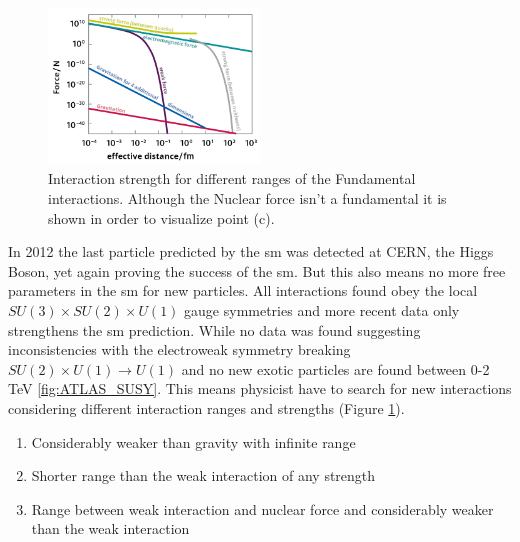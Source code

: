\documentclass[../Bachelorarbeit.tex]{subfiles}
\begin{document}
\label{sec:BSM}
\begin{figure}
    \centering
    \includegraphics[width=0.5\textwidth]{images/Teilchenwet_WW_range.png}
    \caption{Interaction strength for different ranges of the Fundamental interactions. Although the Nuclear force isn't a fundamental it is shown in order to visualize point (c).  \cite{Teilchenwelt} }
    \label{fig:WW_range}
\end{figure}

In 2012 the last particle predicted by the \acrshort{sm} was detected at CERN, the Higgs Boson, yet again proving the success of the \acrshort{sm}.
But this also means no more free parameters in the \acrshort{sm} for new particles. All interactions found obey the local $SU(3) \times SU(2) \times U(1)$ gauge symmetries
and more recent data only strengthens the \acrshort{sm} prediction. While no data was found suggesting inconsistencies with the electroweak symmetry breaking $SU(2) \times U(1) \rightarrow U(1)$
and no new exotic particles are found between 0-2 TeV \ref{fig:ATLAS_SUSY}.
This means physicist have to search for new interactions considering different interaction ranges and strengths (Figure \ref{fig:WW_range}).
\begin{enumerate}[label=(\alph*)]
    \item Considerably weaker than gravity with infinite range
    \item Shorter range than the weak interaction of any strength
    \item Range between weak interaction and nuclear force and considerably weaker than the weak interaction
\end{enumerate}
\end{document}
